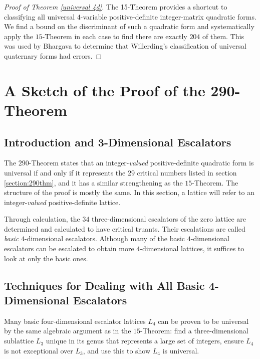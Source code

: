 \documentclass[letterpaper, 12pt]{article}
\begin{document}
\begin{proof}[Proof of Theorem \ref{universal 4d}]
    The 15-Theorem provides a shortcut to classifying all universal $4$-variable positive-definite integer-matrix quadratic forms. We find a bound on the discriminant of such a quadratic form and systematically apply the $15$-Theorem in each case to find there are exactly $204$ of them. This was used by Bhargava to determine that Willerding's classification of universal quaternary forms had errors.
\end{proof}

\section{A Sketch of the Proof of the 290-Theorem}
\subsection{Introduction and 3-Dimensional Escalators}
The $290$-Theorem \cite{twoninety} states that an integer-\emph{valued} positive-definite quadratic form is universal if and only if it represents the $29$ critical numbers listed in section \ref{section:290thm},
and it has a similar strengthening as the $15$-Theorem.
The structure of the proof is mostly the same.
In this section, a lattice will refer to an integer-\emph{valued} positive-definite lattice.

Through calculation, the $34$ three-dimensional escalators of the zero lattice are determined and calculated to have critical truants.
Their escalations are called \emph{basic} $4$-dimensional escalators. Although many of the basic $4$-dimensional escalators can be escalated to obtain more $4$-dimensional lattices, it suffices to look at only the basic ones.

\subsection{Techniques for Dealing with All Basic 4-Dimensional Escalators}
Many basic four-dimensional escalator lattices $L_4$ can be proven to be universal by the same algebraic argument as in the $15$-Theorem:
find a three-dimensional sublattice $L_3$ unique in its genus that represents a large set of integers, ensure $L_4$ is not exceptional over $L_3$, and use this to show $L_4$ is universal.
\end{document}
